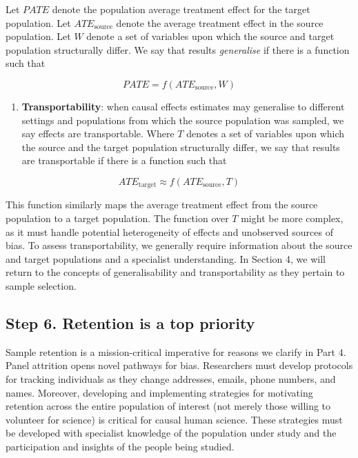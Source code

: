 \documentclass[
  singlecolumn]{report}
\providecommand{\tightlist}{%
  \setlength{\itemsep}{0pt}\setlength{\parskip}{0pt}}\usepackage{longtable,booktabs,array}
\begin{document}
Let \(PATE\) denote the population average treatment effect for the
target population. Let \(ATE_{\text{source}}\) denote the average
treatment effect in the source population. Let \(W\) denote a set of
variables upon which the source and target population structurally
differ. We say that results \emph{generalise} if there is a function
such that

\[PATE =  f(ATE_{\text{source}}, W)\]

\begin{enumerate}
\def\labelenumi{\arabic{enumi}.}
\setcounter{enumi}{3}
\tightlist
\item
  \textbf{Transportability}: when causal effects estimates may
  generalise to different settings and populations from which the source
  population was sampled, we say effects are transportable. Where \(T\)
  denotes a set of variables upon which the source and the target
  population structurally differ, we say that results are transportable
  if there is a function such that
\end{enumerate}

\[ATE_{\text{target}} \approx f(ATE_{\text{source}}, T)\]

This function similarly maps the average treatment effect from the
source population to a target population. The function over \(T\) might
be more complex, as it must handle potential heterogeneity of effects
and unobserved sources of bias. To assess transportability, we generally
require information about the source and target populations and a
specialist understanding. In Section 4, we will return to the concepts
of generalisability and transportability as they pertain to sample
selection.

\hypertarget{step-6.-retention-is-a-top-priority}{%
\subsection{Step 6. Retention is a top
priority}\label{step-6.-retention-is-a-top-priority}}

Sample retention is a mission-critical imperative for reasons we clarify
in Part 4. Panel attrition opens novel pathways for bias. Researchers
must develop protocols for tracking individuals as they change
addresses, emails, phone numbers, and names. Moreover, developing and
implementing strategies for motivating retention across the entire
population of interest (not merely those willing to volunteer for
science) is critical for causal human science. These strategies must be
developed with specialist knowledge of the population under study and
the participation and insights of the people being studied.
\end{document}
